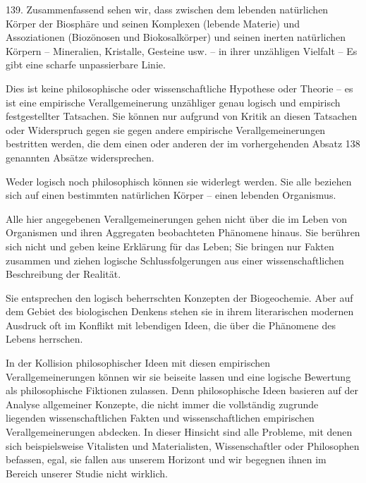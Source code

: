 \documentclass[11pt,a4paper]{book}
\begin{document}
139. Zusammenfassend sehen wir, dass zwischen dem lebenden natürlichen Körper der Biosphäre und seinen Komplexen (lebende Materie) und Assoziationen (Biozönosen und Biokosalkörper) und seinen inerten natürlichen Körpern -- Mineralien, Kristalle, Gesteine usw. -- in ihrer unzähligen Vielfalt -- Es gibt eine scharfe unpassierbare Linie.



Dies ist keine philosophische oder wissenschaftliche Hypothese oder Theorie -- es ist eine empirische Verallgemeinerung unzähliger genau logisch und empirisch festgestellter Tatsachen. Sie können nur aufgrund von Kritik an diesen Tatsachen oder Widerspruch gegen sie gegen andere empirische Verallgemeinerungen bestritten werden, die dem einen oder anderen der im vorhergehenden Absatz 138 genannten Absätze widersprechen.



Weder logisch noch philosophisch können sie widerlegt werden. Sie alle beziehen sich auf einen bestimmten natürlichen Körper -- einen lebenden Organismus.



Alle hier angegebenen Verallgemeinerungen gehen nicht über die im Leben von Organismen und ihren Aggregaten beobachteten Phänomene hinaus. Sie berühren sich nicht und geben keine Erklärung für das Leben; Sie bringen nur Fakten zusammen und ziehen logische Schlussfolgerungen aus einer wissenschaftlichen Beschreibung der Realität.



Sie entsprechen den logisch beherrschten Konzepten der Biogeochemie. Aber auf dem Gebiet des biologischen Denkens stehen sie in ihrem literarischen modernen Ausdruck oft im Konflikt mit lebendigen Ideen, die über die Phänomene des Lebens herrschen.



In der Kollision philosophischer Ideen mit diesen empirischen Verallgemeinerungen können wir sie beiseite lassen und eine logische Bewertung als philosophische Fiktionen zulassen. Denn philosophische Ideen basieren auf der Analyse allgemeiner Konzepte, die nicht immer die vollständig zugrunde liegenden wissenschaftlichen Fakten und wissenschaftlichen empirischen Verallgemeinerungen abdecken. In dieser Hinsicht sind alle Probleme, mit denen sich beispielsweise Vitalisten und Materialisten, Wissenschaftler oder Philosophen befassen, egal, sie fallen aus unserem Horizont und wir begegnen ihnen im Bereich unserer Studie nicht wirklich.
\end{document}
